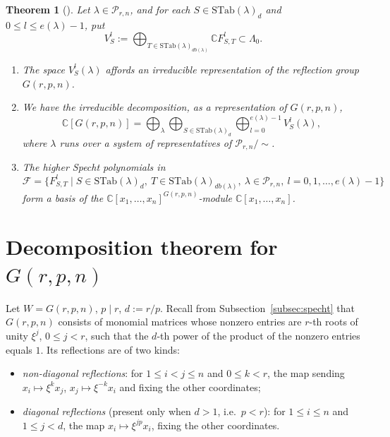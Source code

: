 \documentclass[11pt,a4paper]{article}
\newtheorem{theorem}{Theorem}[section]
\begin{document}
\begin{theorem}[{\cite{MoritaYamada1998}}]\label{thm:2.3}
Let $\lambda \in \mathcal{P}_{r,n}$, and for each
$S \in \mathrm{STab}(\lambda)_d$ and $0 \le l \le e(\lambda)-1$, put
\[
  V^l_S := \bigoplus_{T \in \mathrm{STab}(\lambda)_{db(\lambda)}} \mathbb{C} F^l_{S,T}
  \subset \Lambda_0.
\]
\begin{enumerate}[label=(\roman*)]
  \item The space $V^l_S(\lambda)$ affords an irreducible
    representation of the reflection group $G(r,p,n)$.
  \item We have the irreducible decomposition, as a representation of
    $G(r,p,n)$,
    \[
      \mathbb{C}[G(r,p,n)] = \bigoplus_{\lambda} \bigoplus_{S \in \mathrm{STab}(\lambda)_d}
        \bigoplus_{l=0}^{e(\lambda)-1} V^l_S(\lambda),
    \]
    where $\lambda$ runs over a system of representatives of
    $\mathcal{P}_{r,n}/\!\sim$.
  \item The higher Specht polynomials in
    \[
      \mathcal{F} = \{ F^l_{S,T} \mid S \in \mathrm{STab}(\lambda)_d,\
        T \in \mathrm{STab}(\lambda)_{db(\lambda)},\ \lambda \in \mathcal{P}_{r,n},\
        l=0,1,\dots,e(\lambda)-1 \}
    \]
    form a basis of the $\mathbb{C}[x_1,\dots,x_n]^{G(r,p,n)}$-module
    $\mathbb{C}[x_1,\dots,x_n]$.
\end{enumerate}
\end{theorem}


\section{Decomposition theorem for $G(r,p,n)$}\label{sec:general}

Let $W = G(r,p,n)$, $p \mid r$, $d := r/p$. Recall from
Subsection~\ref{subsec:specht} that $G(r,p,n)$ consists of
monomial matrices whose nonzero entries are $r$-th roots of unity
$\xi^{j}$, $0 \le j < r$, such that the $d$-th power of the product of
the nonzero entries equals $1$. Its reflections are of two kinds:

\begin{itemize}[leftmargin=1.8em]
 \item \emph{non-diagonal reflections}: for $1 \le i < j \le n$ and
 $0 \le k < r$, the map sending $x_i \mapsto \xi^{k} x_j$,
 $x_j \mapsto \xi^{-k} x_i$ and fixing the other coordinates;
 \item \emph{diagonal reflections} (present only when $d > 1$, i.e.\
 $p < r$): for $1 \le i \le n$ and $1 \le j < d$, the map
 $x_i \mapsto \xi^{jp} x_i$, fixing the other coordinates.
\end{itemize}
\end{document}
